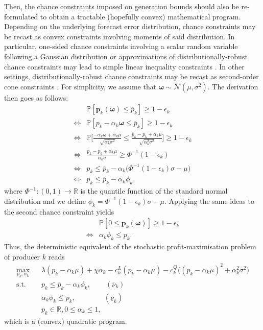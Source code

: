 \documentclass{article}
\begin{document}
Then, the chance constraints imposed on generation bounds should also be re-formulated to obtain a tractable (hopefully convex) mathematical program. Depending on the underlying forecast error distribution, chance constraints may be recast as convex constraints involving moments of said distribution. In particular, one-sided chance constraints involving a scalar random variable following a Gaussian distribution or approximations of distributionally-robust chance constraints may lead to simple linear inequality constraints \cite{Dvorkin2020}. In other settings, distributionally-robust chance constraints may be recast as second-order cone constraints \cite{Xie2018}. For simplicity, we assume that $\boldsymbol{\omega} \sim \mathcal{N}(\mu, \sigma^2)$. The derivation then goes as follows:
\begin{align*}
&\mathbb{P}[\mathbf{p}_k(\boldsymbol{\omega}) \le \overline{p}_k] \ge 1 - \epsilon_k\\
\Leftrightarrow &\mathbb{P}[p_k - \alpha_k \boldsymbol{\omega} \le \overline{p}_k] \ge 1 - \epsilon_k\\
\Leftrightarrow &\mathbb{P}\Big[\frac{- \alpha_k \boldsymbol{\omega} + \alpha_k \mu}{\sqrt{\alpha_k^2 \sigma^2}} \le \frac{\overline{p}_k - p_k + \alpha_k \mu}{\sqrt{\alpha_k^2 \sigma^2}}\Big] \ge 1 - \epsilon_k\\
\Leftrightarrow &\frac{\overline{p}_k - p_k + \alpha_k \mu}{\alpha_k \sigma} \ge \Phi^{-1}(1 - \epsilon_k)\\
\Leftrightarrow &p_k \le \overline{p}_k - \alpha_k \big(\Phi^{-1}(1 - \epsilon_k)\sigma - \mu\big)\\
\Leftrightarrow &p_k \le \overline{p}_k - \alpha_k \phi_k,
\end{align*}
where $\Phi^{-1}: (0, 1) \rightarrow \mathbb{R}$ is the quantile function of the standard normal distribution and we define $\phi_k = \Phi^{-1}(1 - \epsilon_k)\sigma - \mu$. Applying the same ideas to the second chance constraint yields
\begin{align*}
&\mathbb{P}[0 \le \mathbf{p}_k(\boldsymbol{\omega})] \ge 1 - \epsilon_k\\
\Leftrightarrow & \alpha_k \phi_k \le p_k.
\end{align*}
Thus, the deterministic equivalent of the stochastic profit-maximisation problem of producer $k$ reads
\begin{align}
\underset{p_k, \alpha_k}{\max} \hspace{10pt} & \lambda (p_k - \alpha_k \mu) + \chi \alpha_k - c_k^L(p_k - \alpha_k \mu) - c_k^Q \big((p_k - \alpha_k \mu)^2 + \alpha_k^2 \sigma^2\big)\\
\mbox{s.t. } & p_k \le \overline{p}_k - \alpha_k \phi_k, \hspace{25pt} (\overline{\nu}_k)\\
& \alpha_k \phi_k \le p_k, \hspace{48pt}(\underline{\nu}_k)\\
&p_k \in \mathbb{R}, 0 \le \alpha_k \le 1,
\end{align}
which is a (convex) quadratic program.
\end{document}
